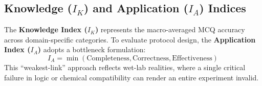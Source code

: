 \documentclass[conference]{IEEEtran}
\begin{document}
\begin{table}[htbp]
    \centering
    \caption{The Hierarchical Metric System of ClearEval. Evaluation scales
    from static knowledge retrieval to empirically-grounded protocol
    execution.}
    \label{tab:metrics}
\end{table}

\subsection{Knowledge ($I_K$) and Application ($I_A$) Indices}
The \textbf{Knowledge Index ($I_K$)} represents the macro-averaged MCQ accuracy
across domain-specific categories. To evaluate protocol design, the
\textbf{Application Index ($I_A$)} adopts a bottleneck formulation:
\begin{equation}
I_A = \min(\text{Completeness}, \text{Correctness}, \text{Effectiveness})
\end{equation}
This ``weakest-link'' approach reflects wet-lab realities, where a single
critical failure in logic or chemical compatibility can render an entire
experiment invalid.
\end{document}
